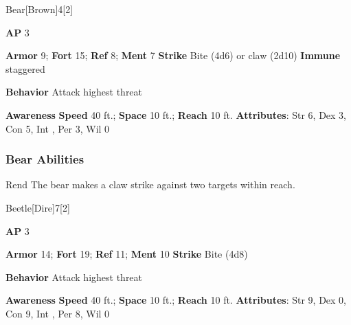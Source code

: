 \begin{monsection}{Bear}[Brown]{4}[2]
\vspace{-1em}\vspace{-1em}
\begin{spellcontent}
\begin{spelltargetinginfo}
{\textbf{AP} 3}

\pari \textbf{Armor} 9;
\textbf{Fort} 15;
\textbf{Ref} 8;
\textbf{Ment} 7
\pari \textbf{Strike} Bite  (4d6) or claw  (2d10)
\pari \textbf{Immune} staggered


\pari \textbf{Behavior} Attack highest threat
\end{spelltargetinginfo}
\end{spellcontent}

\begin{monsterfooter}
\pari \textbf{Awareness} 
\pari \textbf{Speed} 40 ft.;
\textbf{Space} 10 ft.;
\textbf{Reach} 10 ft.
\pari \textbf{Attributes}:
Str 6,
Dex 3,
Con 5,
Int ,
Per 3,
Wil 0
\end{monsterfooter}
\end{monsection}


\subsubsection{Bear Abilities}

\begin{freeability}{Rend}
The bear makes a claw strike against two targets within reach.
\end{freeability}

\begin{monsection}{Beetle}[Dire]{7}[2]
\vspace{-1em}\vspace{-1em}
\begin{spellcontent}
\begin{spelltargetinginfo}
{\textbf{AP} 3}

\pari \textbf{Armor} 14;
\textbf{Fort} 19;
\textbf{Ref} 11;
\textbf{Ment} 10
\pari \textbf{Strike} Bite  (4d8)



\pari \textbf{Behavior} Attack highest threat
\end{spelltargetinginfo}
\end{spellcontent}

\begin{monsterfooter}
\pari \textbf{Awareness} 
\pari \textbf{Speed} 40 ft.;
\textbf{Space} 10 ft.;
\textbf{Reach} 10 ft.
\pari \textbf{Attributes}:
Str 9,
Dex 0,
Con 9,
Int ,
Per 8,
Wil 0
\end{monsterfooter}
\end{monsection}

